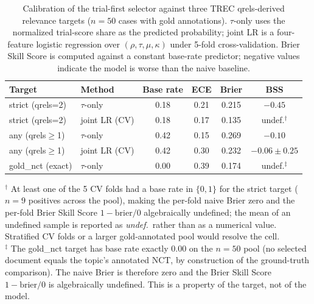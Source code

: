 \documentclass[11pt]{article}
\begin{document}
\begin{table}[!htbp]
\centering
\caption{Calibration of the trial-first selector against three TREC qrels-derived relevance targets ($n{=}50$ cases with gold annotations). $\tau$-only uses the normalized trial-score share as the predicted probability; joint LR is a four-feature logistic regression over $(\rho, \tau, \mu, \kappa)$ under 5-fold cross-validation. Brier Skill Score is computed against a constant base-rate predictor; negative values indicate the model is worse than the naive baseline.}
\label{tab:calibration}
\small
\setlength{\tabcolsep}{6pt}
\begin{tabular}{l l c c c c}
\toprule
Target & Method & Base rate & ECE & Brier & BSS \\
\midrule
strict (qrels=2)     & $\tau$-only      & 0.18 & 0.21 & 0.215 & $-0.45$ \\
strict (qrels=2)     & joint LR (CV)    & 0.18 & 0.17 & 0.135 & undef.$^\dagger$ \\
any (qrels$\geq$1)   & $\tau$-only      & 0.42 & 0.15 & 0.269 & $-0.10$ \\
any (qrels$\geq$1)   & joint LR (CV)    & 0.42 & 0.30 & 0.232 & $-0.06\pm0.25$ \\
gold\_nct (exact)    & $\tau$-only      & 0.00 & 0.39 & 0.174 & undef.$^\ddagger$ \\
\bottomrule
\end{tabular}

\smallskip
\footnotesize
$^\dagger$ At least one of the 5 CV folds had a base rate in $\{0, 1\}$ for the strict target ($n=9$ positives across the pool), making the per-fold naive Brier zero and the per-fold Brier Skill Score $1-\text{brier}/0$ algebraically undefined; the mean of an undefined sample is reported as \emph{undef.}\ rather than as a numerical value. Stratified CV folds or a larger gold-annotated pool would resolve the cell.\\
$^\ddagger$ The gold\_nct target has base rate exactly $0.00$ on the $n=50$ pool (no selected document equals the topic's annotated NCT, by construction of the ground-truth comparison). The naive Brier is therefore zero and the Brier Skill Score $1-\text{brier}/0$ is algebraically undefined. This is a property of the target, not of the model.
\end{table}
\end{document}
